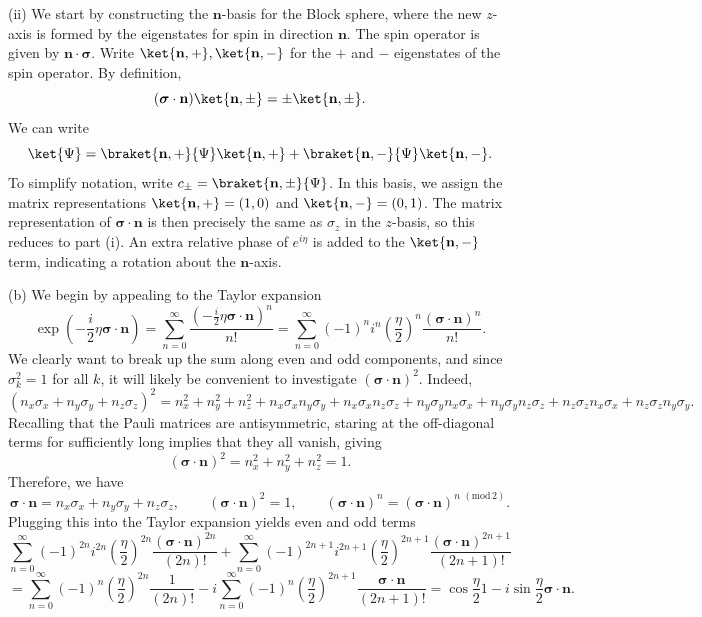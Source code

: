 \documentclass[11pt, letterpaper]{article}
\begin{document}
(ii) We start by constructing the $\mathbf{n} $-basis for the Block sphere, where the new $z$-axis is formed by the eigenstates for spin in direction $\mathbf{n} $. The spin operator is given by $\mathbf{n} \cdot \boldsymbol{\sigma} $. Write $\ket{\mathbf{n} ,+},\ket{\mathbf{n} ,-}$ for the $+$ and $-$ eigenstates of the spin operator. By definition,
\[
	(\boldsymbol{\sigma} \cdot \mathbf{n} )\ket{\mathbf{n} ,\pm}=\pm\ket{\mathbf{n} ,\pm}
.\]
We can write
\[
	\ket{\Psi }=\braket{\mathbf{n} ,+}{\Psi }\ket{\mathbf{n} ,+}+\braket{\mathbf{n} ,-}{\Psi }\ket{\mathbf{n} ,-}
.\]
To simplify notation, write $c_\pm = \braket{\mathbf{n} ,\pm}{\Psi }$. In this basis, we assign the matrix representations $\ket{\mathbf{n} ,+}=(1,0)$ and $\ket{\mathbf{n} ,-}=(0,1)$. The matrix representation of $\boldsymbol{\sigma} \cdot \mathbf{n} $ is then precisely the same as $\sigma _z$ in the $z$-basis, so this reduces to part (i). An extra relative phase of $e^{i\eta } $ is added to the $\ket{\mathbf{n},-}$ term, indicating a rotation about the $\mathbf{n} $-axis.


(b) We begin by appealing to the Taylor expansion
\[
	\exp \left( -\frac{i}{2} \eta \boldsymbol{\sigma} \cdot \mathbf{n}  \right) =\sum_{n=0}^{\infty} \frac{\left( -\frac{i}{2} \eta \boldsymbol{\sigma} \cdot \mathbf{n}  \right)^n }{n!} =\sum_{n=0}^{\infty} (-1)^n i^n \left( \frac{\eta }{2}  \right) ^n\frac{\left( \boldsymbol{\sigma} \cdot \mathbf{n}  \right) ^n}{n!} 
.\]
We clearly want to break up the sum along even and odd components, and since $\sigma_k^2=1$ for all $k$, it will likely be convenient to investigate $(\boldsymbol{\sigma} \cdot \mathbf{n})^2$. Indeed,
\[
	\left( n_x\sigma _x+n_y\sigma _y+n_z\sigma _z \right) ^2=n_x^2+n_y^2+n_z^2+n_x\sigma _xn_y\sigma _y+n_x\sigma _xn_z\sigma _z+n_y\sigma _yn_x\sigma _x+n_y\sigma _yn_z\sigma _z+n_z\sigma _zn_x\sigma _x+n_z\sigma _zn_y\sigma _y
.\]
Recalling that the Pauli matrices are antisymmetric, staring at the off-diagonal terms for sufficiently long implies that they all vanish, giving
\[
	(\boldsymbol{\sigma} \cdot \mathbf{n} )^2=n_x^2+n_y^2+n_z^2=1
.\]
Therefore, we have
\[
\boldsymbol{\sigma} \cdot \mathbf{n} =n_x\sigma _x+n_y\sigma _y+n_z\sigma _z,\qquad (\boldsymbol{\sigma} \cdot \mathbf{n} )^2=1,\qquad (\boldsymbol{\sigma} \cdot \mathbf{n} )^n = (\boldsymbol{\sigma} \cdot \mathbf{n} )^{n\,\,(\text{mod} \,2)} 
.\]
Plugging this into the Taylor expansion yields even and odd terms
\[
	\sum_{n=0}^{\infty} (-1)^{2n} i^{2n} \left( \frac{\eta }{2}  \right) ^{2n}\frac{(\boldsymbol{\sigma} \cdot \mathbf{n} )^{2n} }{(2n)!} +\sum_{n=0}^{\infty} (-1)^{2n+1} i^{2n+1}\left( \frac{\eta }{2}  \right)^{2n+1}  \frac{(\boldsymbol{\sigma} \cdot \mathbf{n} )^{2n+1} }{(2n+1)!} 
\]
\[
	=\sum_{n=0}^{\infty} (-1)^n\left( \frac{\eta }{2}  \right)^{2n}\frac{1}{(2n)!} -i \sum_{n=0}^{\infty} (-1)^n\left( \frac{\eta }{2}  \right)^{2n+1} \frac{\boldsymbol{\sigma} \cdot \mathbf{n} }{(2n+1)!} =\cos \frac{\eta }{2} 1-i \sin \frac{\eta }{2} \boldsymbol{\sigma} \cdot \mathbf{n} 
.\]
\end{document}
